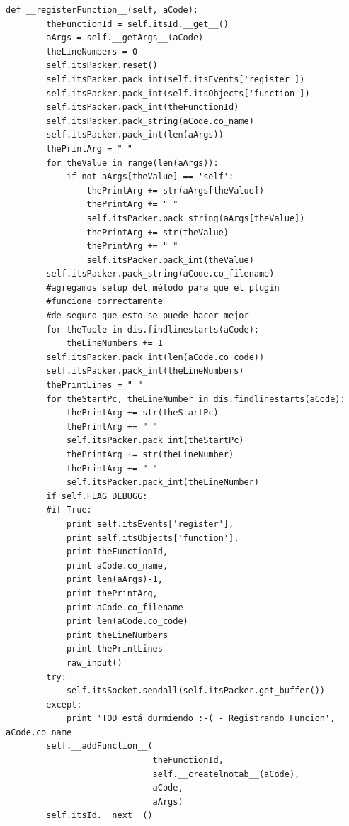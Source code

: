 \documentclass[12pt,legalpaper]{report}
\begin{document}
\begin{singlespace}
\begin{lstlisting}[style=Python]
    def __registerFunction__(self, aCode):
        theFunctionId = self.itsId.__get__()
        aArgs = self.__getArgs__(aCode)
        theLineNumbers = 0
        self.itsPacker.reset()
        self.itsPacker.pack_int(self.itsEvents['register'])
        self.itsPacker.pack_int(self.itsObjects['function'])
        self.itsPacker.pack_int(theFunctionId)
        self.itsPacker.pack_string(aCode.co_name)
        self.itsPacker.pack_int(len(aArgs))
        thePrintArg = " " 
        for theValue in range(len(aArgs)):
            if not aArgs[theValue] == 'self':
                thePrintArg += str(aArgs[theValue])
                thePrintArg += " "
                self.itsPacker.pack_string(aArgs[theValue])
                thePrintArg += str(theValue)
                thePrintArg += " "
                self.itsPacker.pack_int(theValue)
        self.itsPacker.pack_string(aCode.co_filename)
        #agregamos setup del método para que el plugin
        #funcione correctamente
        #de seguro que esto se puede hacer mejor
        for theTuple in dis.findlinestarts(aCode):
            theLineNumbers += 1
        self.itsPacker.pack_int(len(aCode.co_code))        
        self.itsPacker.pack_int(theLineNumbers)
        thePrintLines = " "
        for theStartPc, theLineNumber in dis.findlinestarts(aCode):
            thePrintArg += str(theStartPc)
            thePrintArg += " "            
            self.itsPacker.pack_int(theStartPc)
            thePrintArg += str(theLineNumber)
            thePrintArg += " "            
            self.itsPacker.pack_int(theLineNumber)
        if self.FLAG_DEBUGG:
        #if True:
            print self.itsEvents['register'],
            print self.itsObjects['function'],
            print theFunctionId,
            print aCode.co_name,
            print len(aArgs)-1,
            print thePrintArg,
            print aCode.co_filename
            print len(aCode.co_code)
            print theLineNumbers
            print thePrintLines
            raw_input()
        try:
            self.itsSocket.sendall(self.itsPacker.get_buffer())
        except:
            print 'TOD está durmiendo :-( - Registrando Funcion', aCode.co_name       
        self.__addFunction__(
                             theFunctionId,
                             self.__createlnotab__(aCode),
                             aCode,
                             aArgs)
        self.itsId.__next__()



\end{lstlisting}
\end{singlespace}
\end{document}
